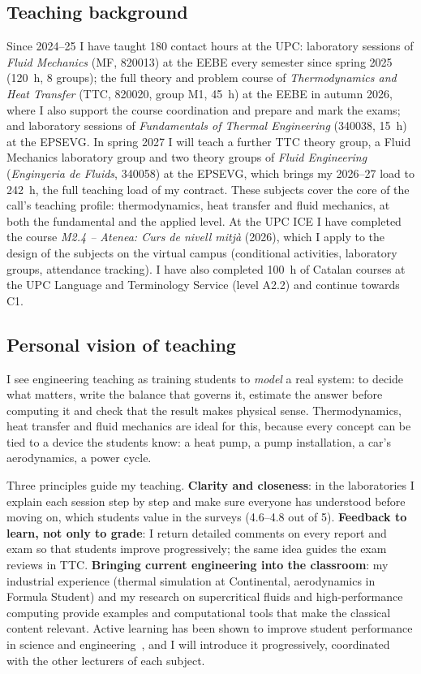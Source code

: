 \documentclass[11pt]{article}
\begin{document}
\subsection{Teaching background}
Since 2024--25 I have taught 180 contact hours at the UPC: laboratory sessions of
\emph{Fluid Mechanics} (MF, 820013) at the EEBE every semester since spring 2025 (120~h,
8 groups); the full theory and problem course of \emph{Thermodynamics and Heat Transfer} (TTC,
820020, group M1, 45~h) at the EEBE in autumn 2026, where I also support the course
coordination and prepare and mark the exams; and laboratory sessions of
\emph{Fundamentals of Thermal Engineering} (340038, 15~h) at the EPSEVG. In spring 2027 I
will teach a further TTC theory group, a Fluid Mechanics laboratory group and two theory
groups of \emph{Fluid Engineering} (\emph{Enginyeria de Fluids}, 340058) at the EPSEVG,
which brings my 2026--27 load to 242~h, the full teaching load of my contract. These subjects cover the core of the
call's teaching profile: thermodynamics, heat transfer and fluid mechanics, at both the
fundamental and the applied level. At the UPC ICE I have completed the course
\emph{M2.4 -- Atenea: Curs de nivell mitj\`a} (2026), which I apply to the design of
the subjects on the virtual campus (conditional activities, laboratory groups,
attendance tracking). I have also completed 100~h of Catalan courses at the UPC
Language and Terminology Service (level A2.2) and continue towards C1.

\subsection{Personal vision of teaching}
I see engineering teaching as training students to \emph{model} a real system: to decide
what matters, write the balance that governs it, estimate the answer before computing it
and check that the result makes physical sense. Thermodynamics, heat transfer and fluid
mechanics are ideal for this, because every concept can be tied to a device the students
know: a heat pump, a pump installation, a car's aerodynamics, a power cycle.

Three principles guide my teaching. \textbf{Clarity and closeness}: in the laboratories I
explain each session step by step and make sure everyone has understood before moving on,
which students value in the surveys (4.6--4.8 out of 5). \textbf{Feedback to
learn, not only to grade}: I return detailed comments on every report and exam so that
students improve progressively; the same idea guides the exam reviews in TTC.
\textbf{Bringing current engineering into the classroom}: my industrial experience
(thermal simulation at Continental, aerodynamics in Formula Student) and my research on
supercritical fluids and high-performance computing provide examples and computational
tools that make the classical content relevant. Active learning has been shown to improve
student performance in science and engineering~\cite{Freeman2014}, and I will introduce it
progressively, coordinated with the other lecturers of each subject.
\end{document}
